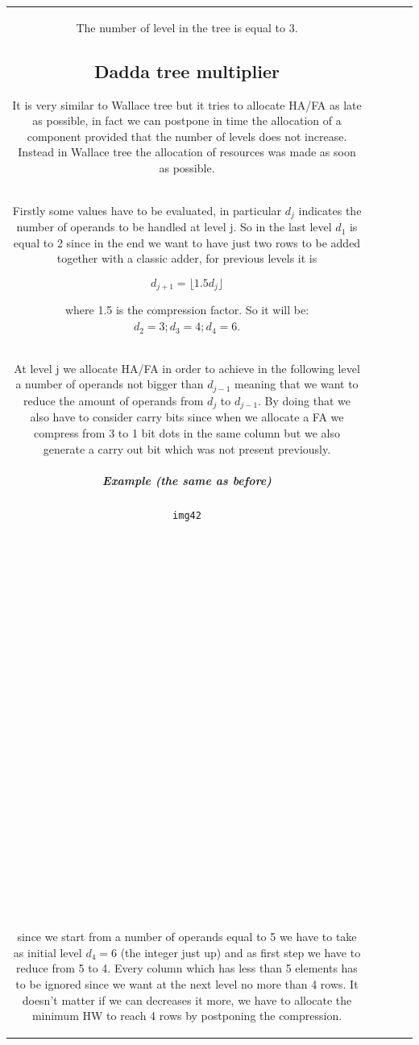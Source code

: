 \begin{center}
\begin{tabular}{|c|c|c|c|c|}
The number of level in the tree is equal to 3.

\subsection{Dadda tree multiplier}
It is very similar to Wallace tree but it tries to allocate HA/FA as late as possible, in fact we can postpone in time the allocation of a component provided that the number of levels does not increase. Instead in Wallace tree the allocation of resources was made as soon as possible.\\

Firstly some values have to be evaluated, in particular $d_j$ indicates the number of operands to be handled at level j. So in the last level $d_1$ is equal to 2 since in the end we want to have just two rows to be added together with a classic adder, for previous levels it is

$$d_{j+1} = \lfloor 1.5 d_j \rfloor$$

where 1.5 is the compression factor. So it will be: $d_2=3; d_3=4; d_4=6$.\\

At level j we allocate HA/FA in order to achieve in the following level a number of operands not bigger than $d_{j-1}$ meaning that we want to reduce the amount of operands from $d_j$ to $d_{j-1}$. By doing that we also have to consider carry bits since when we allocate a FA we compress from 3 to 1 bit dots in the same column but we also generate a carry out bit which was not present previously.

\subparagraph{Example (the same as before)}

\begin{verbatim}
img42


























\end{verbatim}

since we start from a number of operands equal to 5 we have to take as initial level $d_4=6$ (the integer just up) and as first step we have to reduce from 5 to 4. Every column which has less than 5 elements has to be ignored since we want at the next level no more than 4 rows. It doesn't matter if we can decreases it more, we have to allocate the minimum HW to reach 4 rows by postponing the compression.\\


\end{tabular}
\end{center}
